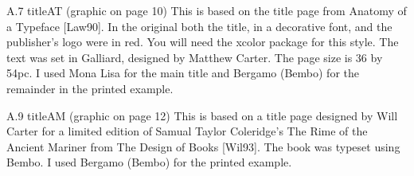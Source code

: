 A.7 titleAT (graphic on page 10)
This is based on the title page from Anatomy of a Typeface [Law90]. In the original
both the title, in a decorative font, and the publisher’s logo were in red. You will need
the xcolor package for this style. The text was set in Galliard, designed by Matthew
Carter. The page size is 36 by 54pc.
I used Mona Lisa for the main title and Bergamo (Bembo) for the remainder in the
printed example.
\newcommand*{\titleAT}{\begingroup%
\FSfont{5bp} %
\drop=0.1\textheight
\vspace*{\drop}
\rule{\textwidth}{1pt}\par
\vspace{2pt}\vspace{-\baselineskip}
\rule{\textwidth}{0.4pt}\par
\vspace{0.5\drop}
\centering
\textcolor{Red}{
{\FSfont{5ml} %
\Huge THE BOOK}\\[0.5\baselineskip]
{\FSfont{5ml}
\Large OF}\\[0.75\baselineskip]
{\FSfont{5ml}
\Huge CONUNDRUMS}}\par
\vspace{0.25\drop}
\rule{0.3\textwidth}{0.4pt}\par
\vspace{\drop}
{\Large \scshape The Author}\par
\vfill
{\large \textcolor{Red}{\plogo}}\\[0.5\baselineskip]
{\large\scshape the publisher}\par
\vspace*{\drop}
\endgroup}

A.9 titleAM (graphic on page 12)
This is based on a title page designed by Will Carter for a limited edition of Samual
Taylor Coleridge’s The Rime of the Ancient Mariner from The Design of Books [Wil93].
The book was typeset using Bembo.
I used Bergamo (Bembo) for the printed example.
\newcommand*{\titleAM}{\begingroup%
\FSfont{5bo} %
\drop = 0.12\textheight
\centering
\vspace*{\drop}
{\large The Author}\\[\baselineskip]
{\Huge THE BIG BOOK}\\[\baselineskip]
{\Large OF}\\[\baselineskip]
{\Huge CONUNDRUMS}\\[\baselineskip]
{\scshape with ten engravings}\\
{\scshape and with a foreword by}\\
{\large\scshape an other}\\[\drop]
{\plogo}\\[0.5\baselineskip]
{\small\scshape the publisher}\par
{\small\scshape year}\par
51
\vfill\null
\endgroup}

